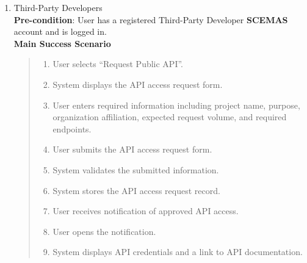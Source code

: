 \documentclass[]{article}
\begin{document}
\begin{enumerate}[{\bf BE7.}]
\begin{enumerate}[{\bf VP1.}]
            \item Third-Party Developers \\
                \textbf{Pre-condition}: User has a registered Third-Party Developer \textbf{SCEMAS} account and is logged in.\\
                \textbf{Main Success Scenario}
                \begin{quote}
                    \begin{enumerate}[1.]
                        \item User selects ``Request Public API''.
                        \item System displays the API access request form.
                        \item User enters required information including project name, purpose, organization affiliation, expected request volume, and required endpoints.
                        \item User submits the API access request form.
                        \item System validates the submitted information.
                        \item System stores the API access request record.
                        \item User receives notification of approved API access.
                        \item User opens the notification.
                        \item System displays API credentials and a link to API documentation.
                    \end{enumerate}
                \end{quote}


\end{enumerate}
\end{enumerate}
\end{document}
